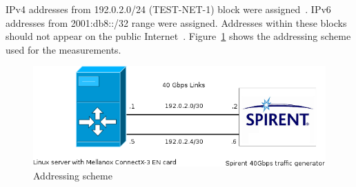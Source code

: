 IPv4 addresses from 192.0.2.0/24 (TEST-NET-1) block were assigned~\cite{rfc5737}.
IPv6 addresses from 2001:db8::/32 range were assigned.
Addresses within these blocks should not appear on the public Internet~\cite{rfc3849}.
Figure~\ref{fig:addressing-scheme} shows the addressing scheme used for the measurements.
\begin{figure}[H]
	\centering
	\includegraphics[width=13.5cm,keepaspectratio]{fig/net-setup.png}
	\caption{Addressing scheme}
	\label{fig:addressing-scheme}
\end{figure}








